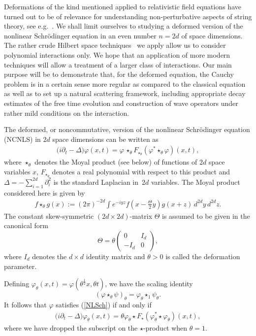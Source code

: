 \documentclass[11pt]{article}
\begin{document}
Deformations of the kind mentioned applied to relativistic f\/ield
equations have turned out to be of relevance for understanding
non-perturbative aspects of string theory, see e.g.~\cite{GMS,HKL,DJN}.
We shall limit ourselves to studying a deformed version of the
nonlinear Schr{\"o}dinger equation in an even number $n=2d$ of space
dimensions. The rather crude Hilbert space
techniques~\cite{Reed,RS} we apply allow us to consider polynomial
interactions only. We hope that an application of more modern techniques
\cite{Caz} will allow a treatment of a larger class of interactions.
Our main purpose will be to demonstrate that, for
the deformed equation,  the Cauchy problem is in a certain sense more
regular as compared to the
classical equation as well as to set up a natural scattering framework,
 including appropriate decay estimates of the free time evolution
and construction of wave operators under rather mild conditions on the
interaction.

The deformed, or
noncommutative, version of the nonlinear Schr{\"o}dinger
equation (NCNLS) in $2d$ space dimensions can be written as
\begin{gather}
\label{NLSch}
\big(i\partial_t-{\Delta}\big)\varphi(x,t) =
\varphi\,\star_\theta F_{\star_\theta}(\varphi^*\star_\theta\varphi)(x,t) ,
\end{gather}
where $\star_\theta$ denotes the Moyal product (see below) of functions of
$2d$ space variables $x$, $F_{\star_\theta}$ denotes a real polynomial
with respect to this product and ${\Delta}=-\sum_{i=1}^{2d}\partial_i^2$ is
the standard Laplacian in~$2d$ variables.
The Moyal product considered here is given by
\begin{gather*}
f\star_\theta g(x):=(2\pi)^{-2d}\int e^{-iyz} f\left(x-\frac\Theta2
y\right)  g(x+z)\,d^{2d} y\,d^{2d} z .
\end{gather*}
The constant skew-symmetric $(2d\times2d)$-matrix $\Theta$ is assumed to
be given in the canonical form
\[
\Theta  =  \theta \begin{pmatrix} 0 & I_d\\ -I_d & 0\end{pmatrix} ,
\]
where $I_d$ denotes the $d\times d$ identity matrix and
$\theta>0$ is called the deformation parameter.

Def\/ining
$\varphi_\theta(x,t) = \varphi(\theta^\frac 12 x,\theta t)$,
we have the scaling identity
\[
(\varphi\star_\theta \psi)_{\theta} = \varphi_{\theta}\star_1 \psi_{\theta}.
\]
It follows that $\varphi$ satisf\/ies (\ref{NLSch}) if and only if
\begin{gather*}
\big(i\partial_t-\Delta\big)\varphi_\theta(x,t) =
\theta \varphi_\theta \star F_\star(\varphi_\theta^*\star\varphi_\theta)(x,t) ,
\end{gather*}
where we have dropped the subscript on the $\star$-product when $\theta =1$.
\end{document}
